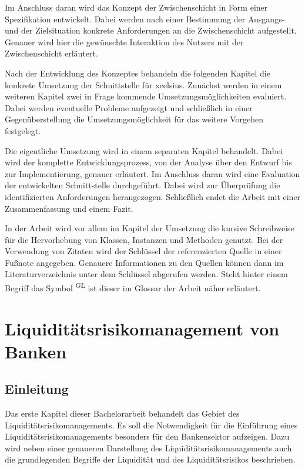 \begin{onehalfspacing}
Im Anschluss daran wird das Konzept der Zwischenschicht in Form einer Spezifikation entwickelt. Dabei werden nach einer Bestimmung der Ausgangs- und der Zielsituation konkrete Anforderungen an die Zwischenschicht aufgestellt. Genauer wird hier die gewünschte Interaktion des Nutzers mit der Zwischenschicht erläutert.

Nach der Entwicklung des Konzeptes behandeln die folgenden Kapitel die konkrete Umsetzung der Schnittstelle für \gls{xcelsius}. Zunächst werden in einem weiteren Kapitel zwei in Frage kommende Umsetzungsmöglichkeiten evaluiert. Dabei werden eventuelle Probleme aufgezeigt und schließlich in einer Gegenüberstellung die Umsetzungsmöglichkeit für das weitere Vorgehen festgelegt.

Die eigentliche Umsetzung wird in einem separaten Kapitel behandelt. Dabei wird der komplette Entwicklungsprozess, von der Analyse über den Entwurf bis zur Implementierung, genauer erläutert. Im Anschluss daran wird eine Evaluation der entwickelten Schnittstelle durchgeführt. Dabei wird zur Überprüfung die identifizierten Anforderungen herangezogen. Schließlich endet die Arbeit mit einer Zusammenfassung und einem Fazit.

In der Arbeit wird vor allem im Kapitel der Umsetzung die kursive Schreibweise für die Hervorhebung von Klassen, Instanzen und Methoden genutzt. Bei der Verwendung von Zitaten wird der Schlüssel der referenzierten Quelle in einer Fußnote angegeben. Genauere Informationen zu den Quellen können dann im Literaturverzeichnis unter dem Schlüssel abgerufen werden. Steht hinter einem Begriff das Symbol \textsuperscript{GL} ist dieser im Glossar der Arbeit näher erläutert.

\chapter{Liquiditätsrisikomanagement von Banken}

\section{Einleitung}
Das erste Kapitel dieser Bachelorarbeit behandelt das Gebiet des Liquiditätsrisikomanagements. Es soll die Notwendigkeit für die Einführung eines Liquiditätsrisikomanagements besonders für den Bankensektor aufzeigen. Dazu wird neben einer genaueren Darstellung des Liquiditätsrisikomanagements auch die grundlegenden Begriffe der Liquidität und des Liquiditätsrisikos beschrieben.


\end{onehalfspacing}
